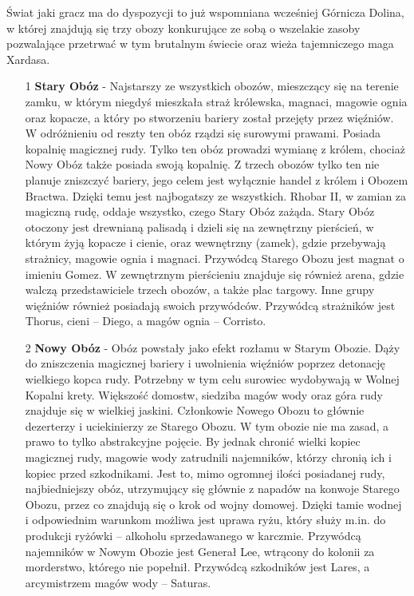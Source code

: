 \documentclass[11pt,polish, openany]{book}
\begin{document}
Świat jaki gracz ma do dyspozycji to już wspomniana wcześniej Górnicza Dolina, w której znajdują się trzy obozy konkurujące ze sobą o wszelakie zasoby pozwalające przetrwać w tym brutalnym świecie oraz wieża tajemniczego maga Xardasa.
\begin{itemize}
    \item [1] \textbf{Stary Obóz} - Najstarszy ze wszystkich obozów, mieszczący się na terenie zamku, w którym niegdyś mieszkała straż królewska, magnaci, magowie ognia oraz kopacze, a który po stworzeniu bariery został przejęty przez więźniów. W odróżnieniu od reszty ten obóz rządzi się surowymi prawami. Posiada kopalnię magicznej rudy. Tylko ten obóz prowadzi wymianę z królem, chociaż Nowy Obóz także posiada swoją kopalnię. Z trzech obozów tylko ten nie planuje zniszczyć bariery, jego celem jest wyłącznie handel z królem i Obozem Bractwa. Dzięki temu jest najbogatszy ze wszystkich. Rhobar II, w zamian za magiczną rudę, oddaje wszystko, czego Stary Obóz zażąda. Stary Obóz otoczony jest drewnianą palisadą i dzieli się na zewnętrzny pierścień, w którym żyją kopacze i cienie, oraz wewnętrzny (zamek), gdzie przebywają strażnicy, magowie ognia i magnaci. Przywódcą Starego Obozu jest magnat o imieniu Gomez. W zewnętrznym pierścieniu znajduje się również arena, gdzie walczą przedstawiciele trzech obozów, a także plac targowy. Inne grupy więźniów również posiadają swoich przywódców. Przywódcą strażników jest Thorus, cieni – Diego, a magów ognia – Corristo.
    \item [2] \textbf{Nowy Obóz} - Obóz powstały jako efekt rozłamu w Starym Obozie. Dąży do zniszczenia magicznej bariery i uwolnienia więźniów poprzez detonację wielkiego kopca rudy. Potrzebny w tym celu surowiec wydobywają w Wolnej Kopalni krety. Większość domostw, siedziba magów wody oraz góra rudy znajduje się w wielkiej jaskini. Członkowie Nowego Obozu to głównie dezerterzy i uciekinierzy ze Starego Obozu. W tym obozie nie ma zasad, a prawo to tylko abstrakcyjne pojęcie. By jednak chronić wielki kopiec magicznej rudy, magowie wody zatrudnili najemników, którzy chronią ich i kopiec przed szkodnikami. Jest to, mimo ogromnej ilości posiadanej rudy, najbiedniejszy obóz, utrzymujący się głównie z napadów na konwoje Starego Obozu, przez co znajdują się o krok od wojny domowej. Dzięki tamie wodnej i odpowiednim warunkom możliwa jest uprawa ryżu, który służy m.in. do produkcji ryżówki – alkoholu sprzedawanego w karczmie. Przywódcą najemników w Nowym Obozie jest Generał Lee, wtrącony do kolonii za morderstwo, którego nie popełnił. Przywódcą szkodników jest Lares, a arcymistrzem magów wody – Saturas.

\end{itemize}
\end{document}
